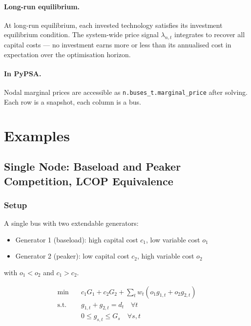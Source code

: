 \documentclass{article}
\begin{document}
\paragraph{Long-run equilibrium.}
At long-run equilibrium, each invested technology satisfies its investment
equilibrium condition. The system-wide price signal $\lambda_{n,t}$ integrates
to recover all capital costs --- no investment earns more or less than its
annualised cost in expectation over the optimisation horizon.

\paragraph{In PyPSA.}
Nodal marginal prices are accessible as \texttt{n.buses\_t.marginal\_price}
after solving. Each row is a snapshot, each column is a bus.

\section{Examples}
\label{sec:examples}

\subsection{Single Node: Baseload and Peaker Competition, LCOP Equivalence}
\label{sec:single_node}

\subsubsection{Setup}

A single bus with two extendable generators:
\begin{itemize}
    \item Generator 1 (baseload): high capital cost $c_1$, low variable cost $o_1$
    \item Generator 2 (peaker): low capital cost $c_2$, high variable cost $o_2$
\end{itemize}
with $o_1 < o_2$ and $c_1 > c_2$.

\begin{align}
\min \quad
    & c_1 G_1 + c_2 G_2
      + \sum_t w_t (o_1 g_{1,t} + o_2 g_{2,t}) \\
\text{s.t.} \quad
    & g_{1,t} + g_{2,t} = d_t \quad \forall t \\
    & 0 \le g_{s,t} \le G_s \quad \forall s,t
\end{align}
\end{document}
